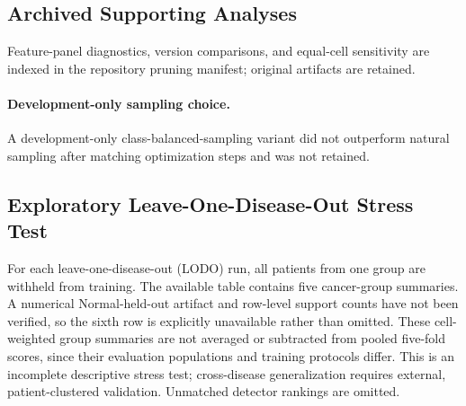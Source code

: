 \documentclass{article} %
\begin{document}


\subsection{Archived Supporting Analyses}
\label{sec:appendix:minimal_panel}

Feature-panel diagnostics, version comparisons, and equal-cell sensitivity
are indexed in the repository pruning manifest; original artifacts are retained.

\paragraph{Development-only sampling choice.}
\label{sec:appendix:sampler}

A development-only class-balanced-sampling variant did not outperform natural sampling after matching optimization steps and was not retained.

\subsection{Exploratory Leave-One-Disease-Out Stress Test}
\label{sec:appendix:novelty}

For each leave-one-disease-out (LODO) run, all patients from one group are
withheld from training. The available table contains five cancer-group
summaries. A numerical Normal-held-out artifact and row-level support counts
have not been verified, so the sixth row is explicitly unavailable rather
than omitted. These cell-weighted group summaries are not averaged or
subtracted from pooled five-fold scores, since their evaluation populations
and training protocols differ. This is an incomplete descriptive stress test;
cross-disease generalization requires external, patient-clustered validation.
Unmatched detector rankings are omitted.




\end{document}
